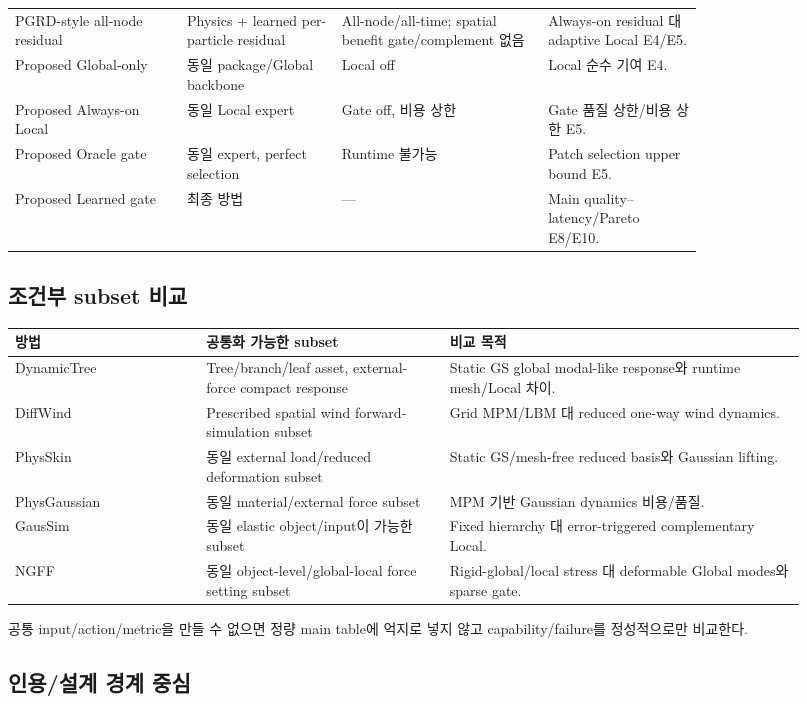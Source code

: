 \documentclass[10pt,a4paper]{article}
\begin{document}
\begin{longtable}{L{0.20\linewidth}L{0.18\linewidth}L{0.24\linewidth}L{0.18\linewidth}}
PGRD-style all-node residual & Physics + learned per-particle residual & All-node/all-time; spatial benefit gate/complement 없음 & Always-on residual 대 adaptive Local E4/E5. \\
Proposed Global-only & 동일 package/Global backbone & Local off & Local 순수 기여 E4. \\
Proposed Always-on Local & 동일 Local expert & Gate off, 비용 상한 & Gate 품질 상한/비용 상한 E5. \\
Proposed Oracle gate & 동일 expert, perfect selection & Runtime 불가능 & Patch selection upper bound E5. \\
Proposed Learned gate & 최종 방법 & --- & Main quality--latency/Pareto E8/E10. \\
\bottomrule
\end{longtable}
\normalsize

\subsection{조건부 subset 비교}

\begin{longtable}{L{0.22\linewidth}L{0.29\linewidth}L{0.41\linewidth}}
\toprule
방법 & 공통화 가능한 subset & 비교 목적 \\
\midrule
DynamicTree & Tree/branch/leaf asset, external-force compact response & Static GS global modal-like response와 runtime mesh/Local 차이. \\
DiffWind & Prescribed spatial wind forward-simulation subset & Grid MPM/LBM 대 reduced one-way wind dynamics. \\
PhysSkin & 동일 external load/reduced deformation subset & Static GS/mesh-free reduced basis와 Gaussian lifting. \\
PhysGaussian & 동일 material/external force subset & MPM 기반 Gaussian dynamics 비용/품질. \\
GausSim & 동일 elastic object/input이 가능한 subset & Fixed hierarchy 대 error-triggered complementary Local. \\
NGFF & 동일 object-level/global-local force setting subset & Rigid-global/local stress 대 deformable Global modes와 sparse gate. \\
\bottomrule
\end{longtable}

공통 input/action/metric을 만들 수 없으면 정량 main table에 억지로 넣지 않고 capability/failure를 정성적으로만 비교한다.

\subsection{인용/설계 경계 중심}
\end{document}
